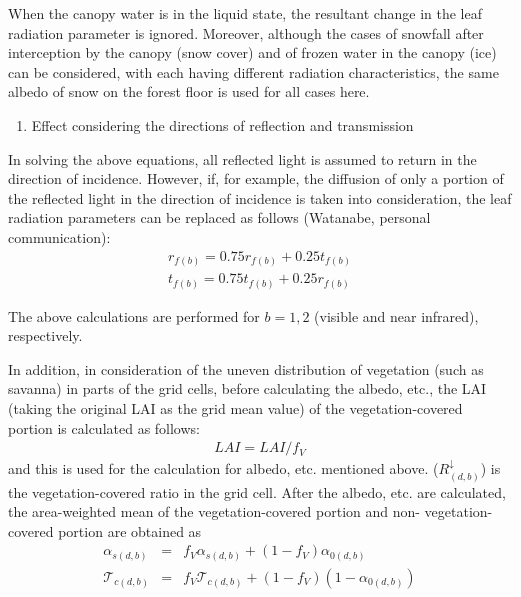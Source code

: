 When the canopy water is in the liquid state, the resultant change in the leaf radiation parameter is ignored. Moreover, although the cases of snowfall after interception by the canopy (snow cover)
and of frozen water in the canopy (ice) can be considered, with each having different radiation characteristics, the same albedo of snow on the forest floor is used for all cases here.

\begin{enumerate}
\def\labelenumi{\arabic{enumi}.}
\setcounter{enumi}{1}
\tightlist
\item
  Effect considering the directions of reflection and transmission
\end{enumerate}

In solving the above equations, all reflected light is assumed to return in the direction of incidence. However, if, for example, the diffusion of only a portion of the reflected light in the
direction of incidence is taken into consideration, the leaf radiation parameters can be replaced as follows (Watanabe, personal communication): \begin{eqnarray}
  r_{f(b)} = 0.75 r_{f(b)} + 0.25 t_{f(b)} \\
  t_{f(b)} = 0.75 t_{f(b)} + 0.25 r_{f(b)}
\end{eqnarray}

The above calculations are performed for \(b=1, 2\) (visible and near infrared), respectively.

In addition, in consideration of the uneven distribution of vegetation (such as savanna) in parts of the grid cells, before calculating the albedo, etc., the LAI (taking the original LAI as the grid
mean value) of the vegetation-covered portion is calculated as follows: \begin{eqnarray}
  LAI = LAI / f_V
\end{eqnarray} and this is used for the calculation for albedo, etc. mentioned above. (\(R^{\downarrow}_{(d,b)}\)) is the vegetation-covered ratio in the grid cell. After the albedo, etc. are calculated, the
area-weighted mean of the vegetation-covered portion and non- vegetation-covered portion are obtained as \begin{eqnarray}
  \alpha_{s(d,b)} &=& f_V \alpha_{s(d,b)}
                       + ( 1 - f_V ) \alpha_{0(d,b)} \\
  {\mathcal{T}}_{c(d,b)} &=& f_V {\mathcal{T}}_{c(d,b)}
                       + ( 1 - f_V ) ( 1 - \alpha_{0(d,b)} )
\end{eqnarray}

